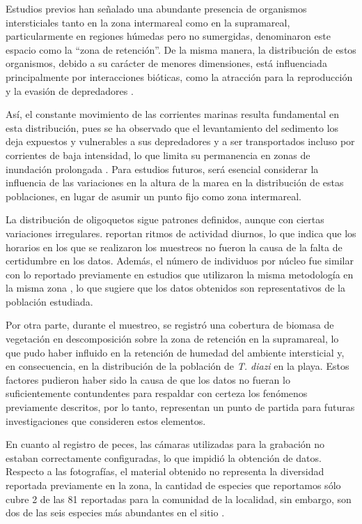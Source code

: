 \documentclass[
  authoryear,
  preprint,
  3p,
  twocolumn]{elsarticle}
\begin{document}
Estudios previos han señalado una abundante presencia de organismos
intersticiales tanto en la zona intermareal como en la supramareal,
particularmente en regiones húmedas pero no sumergidas,
\citet{McLachlanBrown2006} denominaron este espacio como la ``zona de
retención''. De la misma manera, la distribución de estos organismos,
debido a su carácter de menores dimensiones, está influenciada
principalmente por interacciones bióticas, como la atracción para la
reproducción y la evasión de depredadores \citep{Giere2009}.

Así, el constante movimiento de las corrientes marinas resulta
fundamental en esta distribución, pues se ha observado que el
levantamiento del sedimento los deja expuestos y vulnerables a sus
depredadores y a ser transportados incluso por corrientes de baja
intensidad, lo que limita su permanencia en zonas de inundación
prolongada \citep{McLachlanBrown2006}. Para estudios futuros, será
esencial considerar la influencia de las variaciones en la altura de la
marea en la distribución de estas poblaciones, en lugar de asumir un
punto fijo como zona intermareal.

La distribución de oligoquetos sigue patrones definidos, aunque con
ciertas variaciones irregulares. \citet{EdwardsArancon2022} reportan
ritmos de actividad diurnos, lo que indica que los horarios en los que
se realizaron los muestreos no fueron la causa de la falta de
certidumbre en los datos. Además, el número de individuos por núcleo fue
similar con lo reportado previamente en estudios que utilizaron la misma
metodología en la misma zona \citep{Guerra-Castro2020}, lo que sugiere
que los datos obtenidos son representativos de la población estudiada.

Por otra parte, durante el muestreo, se registró una cobertura de
biomasa de vegetación en descomposición sobre la zona de retención en la
supramareal, lo que pudo haber influido en la retención de humedad del
ambiente intersticial y, en consecuencia, en la distribución de la
población de \emph{T. diazi} en la playa. Estos factores pudieron haber
sido la causa de que los datos no fueran lo suficientemente contundentes
para respaldar con certeza los fenómenos previamente descritos, por lo
tanto, representan un punto de partida para futuras investigaciones que
consideren estos elementos.

En cuanto al registro de peces, las cámaras utilizadas para la grabación
no estaban correctamente configuradas, lo que impidió la obtención de
datos. Respecto a las fotografías, el material obtenido no representa la
diversidad reportada previamente en la zona, la cantidad de especies que
reportamos sólo cubre 2 de las 81 reportadas para la comunidad de la
localidad, sin embargo, son dos de las seis especies más abundantes en
el sitio \citep{ArceoCarranza2009}.
\end{document}
